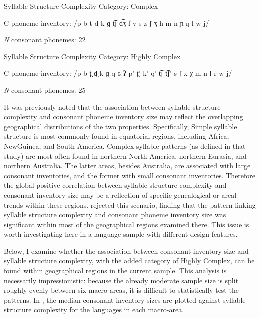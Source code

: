 \ea\label{ex:4.24}
\begin{Coding}
\item[Syllable Structure Complexity Category:] Complex

\item[C phoneme inventory:] /p b t d k ɡ t͡ʃ d͡ʒ f v s z ʃ ʒ h m n ɲ ŋ l w j/

\item[\textit{N} consonant phonemes:] 22
\end{Coding}
\z

\ea\label{ex:4.25}
\begin{Coding}
\item[Syllable Structure Complexity Category:] Highly Complex

\item[C phoneme inventory:] /p b t̪ d̪ k ɡ q ɢ ʔ p’ t̪’ k’ q’ t͡ʃ t͡ʃ’ s ʃ x χ m n l r w j/

\item[\textit{N} consonant phonemes:] 25
\end{Coding}
\z

  It was previously noted that the association between syllable structure complexity and consonant phoneme inventory size may reflect the overlapping geographical distributions of the two properties. Specifically, Simple syllable structure is most commonly found in equatorial regions, including Africa, New\linebreak Guinea, and South America. Complex syllable patterns (as defined in that study) are most often found in northern North America, northern Eurasia, and northern Australia. The latter areas, besides Australia, are associated with large consonant inventories, and the former with small consonant inventories. Therefore the global positive correlation between syllable structure complexity and consonant inventory size may be a reflection of specific genealogical or areal trends within these regions. \citet{Maddieson2006} rejected this scenario, finding that the pattern linking syllable structure complexity and consonant phoneme inventory size was significant within most of the geographical regions examined there. This issue is worth investigating here in a language sample with different design features.

  Below, I examine whether the association between consonant inventory size and syllable structure complexity, with the added category of Highly Complex, can be found within geographical regions in the current sample. This analysis is necessarily impressionistic: because the already moderate sample size is split roughly evenly between six macro-areas, it is difficult to statistically test the patterns. In , the median consonant inventory sizes are plotted against syllable structure complexity for the languages in each macro-area.


